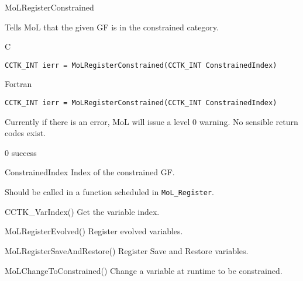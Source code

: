 \begin{FunctionDescription}{MoLRegisterConstrained}
  \label{CactusBase_MoL_MoLRegisterConstrained}
  
  Tells MoL that the given GF is in the constrained category.

  \begin{SynopsisSection}
    \begin{Synopsis}{C}
\begin{verbatim}
CCTK_INT ierr = MoLRegisterConstrained(CCTK_INT ConstrainedIndex)
\end{verbatim}
    \end{Synopsis}
    \begin{Synopsis}{Fortran}
\begin{verbatim}
CCTK_INT ierr = MoLRegisterConstrained(CCTK_INT ConstrainedIndex)
\end{verbatim}
    \end{Synopsis}
  \end{SynopsisSection}

  \begin{ResultSection}
    \begin{ResultNote}
      Currently if there is an error, MoL will issue a level 0
      warning. No sensible return codes exist.
    \end{ResultNote}
    \begin{Result}{\rm 0}
      success
    \end{Result}
  \end{ResultSection}

  \begin{ParameterSection}
    \begin{Parameter}{ConstrainedIndex}
      Index of the constrained GF.
    \end{Parameter}
  \end{ParameterSection}

  \begin{Discussion}
    Should be called in a function scheduled in {\tt MoL\_Register}.
  \end{Discussion}

  \begin{SeeAlsoSection}
    \begin{SeeAlso}{CCTK\_VarIndex()}
      Get the variable index.
    \end{SeeAlso}
    \begin{SeeAlso}{MoLRegisterEvolved()}
      Register evolved variables.
    \end{SeeAlso}
    \begin{SeeAlso}{MoLRegisterSaveAndRestore()}
      Register Save and Restore variables.
    \end{SeeAlso}
    \begin{SeeAlso}{MoLChangeToConstrained()}
      Change a variable at runtime to be constrained.
    \end{SeeAlso}
  \end{SeeAlsoSection}


\end{FunctionDescription}
